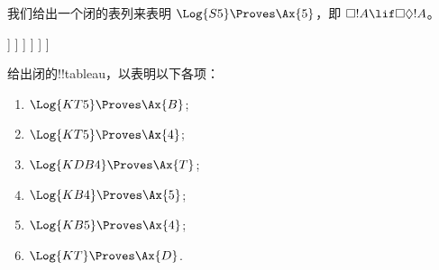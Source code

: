 \documentclass[../../../include/open-logic-section]{subfiles}
\begin{document}
\begin{ex}
  我们给出一个闭的表列来表明 $\Log{S5} \Proves \Ax{5}$，即
  $\Box!A \lif \Box\Diamond!A$。
  \begin{oltableau}
    [\pFmla{\False}{\Box\formula{A} \lif \Box\Diamond \formula{A}}{1},
      just = \TAss
      [\pFmla{\True}{\Box \formula{A}}{1}, just = {\TRule{\False}{\lif}[1]}
        [\pFmla{\False}{\Box\Diamond \formula{A}}{1},
          just = {\TRule{\False}{\lif}[1]}
          [\pFmla{\False}{\Diamond \formula{A}}{1.1},
            just = {\TRule{\False}{\Box}[3]}
            [\pFmla{\False}{\Diamond \formula{A}}{1},
              just = {4r$\Diamond$ 4}
              [\pFmla{\False}{\formula{A}}{1.1},
                just = {\TRule{\False}{\Diamond}[5]}
                [\pFmla{\True}{\formula{A}}{1.1},
                  just = {\TRule{\True}{\Box}[2]}, close]
              ]
            ]
          ]
        ]
      ]
    ]
  \end{oltableau}
\end{ex}

\begin{prob}
给出闭的!!{tableau}，以表明以下各项：
  \begin{enumerate}
  \item $\Log{KT5} \Proves \Ax{B}$;
  \item $\Log{KT5} \Proves \Ax{4}$;
  \item $\Log{KDB4} \Proves \Ax{T}$;
  \item $\Log{KB4} \Proves \Ax{5}$;
  \item $\Log{KB5} \Proves \Ax{4}$;
  \item $\Log{KT} \Proves \Ax{D}$.
  \end{enumerate}
\end{prob}
\end{document}
